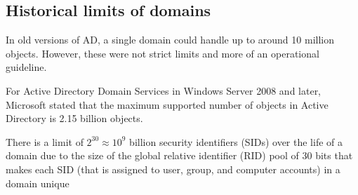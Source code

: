 \documentclass{article}
\begin{document}
\subsection{Historical limits of domains}
In old versions of AD, a single domain could handle up to around 
10 million objects. However, these were not strict limits 
and more of an operational guideline. 

For Active Directory Domain Services in Windows Server 2008 and later, 
Microsoft stated that the maximum supported number of objects 
in Active Directory is 2.15 billion objects. 

There is a limit of $2^{30} \approx 10^9$ billion security 
identifiers (SIDs) over the life of a domain 
due to the size of the global relative identifier (RID) 
pool of 30 bits that makes each SID 
(that is assigned to user, group, and computer accounts) in a domain unique
\end{document}
